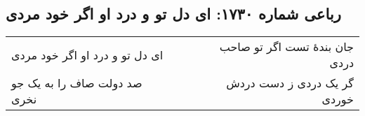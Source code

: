 \begin{center}
\section*{رباعی شماره ۱۷۳۰: ای دل تو و درد او اگر خود مردی}
\label{sec:1730}
\begin{longtable}{l p{0.5cm} r}
ای دل تو و درد او اگر خود مردی
&&
جان بندهٔ تست اگر تو صاحب دردی
\\
صد دولت صاف را به یک جو نخری
&&
گر یک دردی ز دست دردش خوردی
\\
\end{longtable}
\end{center}
